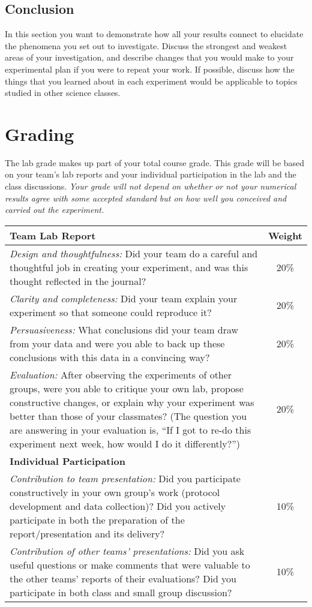 \subsection*{Conclusion}
In this section you want to demonstrate how all your results connect to elucidate the phenomena you set out to investigate.
Discuss the strongest and weakest areas of your investigation, and describe changes that you would make to your experimental plan if you were to repeat your work.
If possible, discuss how the things that you learned about in each experiment would be applicable to topics studied in other science classes.

\newpage
\section*{Grading}
The lab grade makes up part of your total course grade.
This grade will be based on your team's lab reports and your individual participation in the lab and the class discussions.
\emph{Your grade will not depend on whether or not your numerical results agree with some accepted standard but on how well you conceived and carried out the experiment.} \\

\begin{tabular}{|p{13cm}|c|}
\hline
\textbf{Team Lab Report} & \textbf{Weight} \\
\hline
\emph{Design and thoughtfulness:} Did your team do a careful and thoughtful job in creating your experiment, and was this thought reflected in the journal? & 20\% \\
\hline
\emph{Clarity and completeness:} Did your team explain your experiment so that someone could reproduce it? & 20\% \\
\hline
\emph{Persuasiveness:} What conclusions did your team draw from your data and were you able to back up these conclusions with this data in a convincing way? & 20\% \\
\hline
\emph{Evaluation:} After observing the experiments of other groups, were you able to critique your own lab, propose constructive changes, or explain why your experiment was better than those of your classmates?  (The question you are answering in your evaluation is, ``If I got to re-do this experiment next week, how would I do it differently?'') & 20\% \\
\hline
\textbf{Individual Participation} & \\
\hline
\emph{Contribution to team presentation:} Did you participate constructively in your own group's work (protocol development and data collection)?  Did you actively participate in both the preparation of the report/presentation and its delivery? & 10\% \\
\hline
\emph{Contribution of other teams' presentations:} Did you ask useful questions or make comments that were valuable to the other teams' reports of their evaluations?  Did you participate in both class and small group discussion? & 10\% \\
\hline
\end{tabular}

